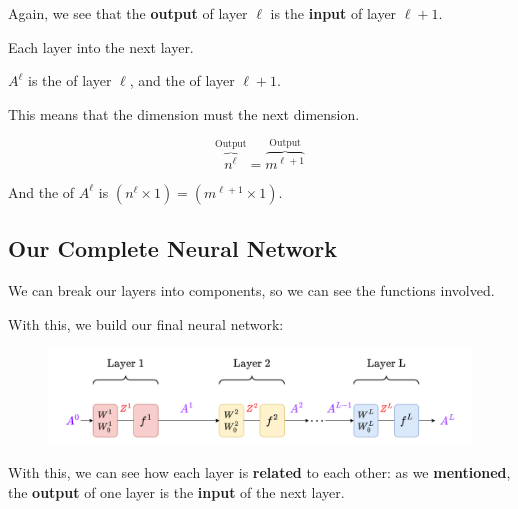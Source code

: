         Again, we see that the \textbf{output} of layer $\ell$ is the \textbf{input} of layer $\ell+1$.\\
        
        \begin{concept}
            Each layer  into the next layer.
            
            $A^\ell$ is the  of layer $\ell$, and the  of layer $\ell+1$.
            
            This means that the  dimension must  the next  dimension.
            
            \begin{equation*}
                \overbrace{
                    n^\ell
                }^{\text{Output}}
                =
                \overbrace{
                    m^{\ell+1}
                }^{\text{Output}}
            \end{equation*}
            
            And the  of $A^\ell$ is $(n^\ell \times 1) = (m^{\ell+1} \times 1)$.
        \end{concept}
        
    \subsection{Our Complete Neural Network}
    
        We can break our layers into components, so we can see the functions involved. 
        
        With this, we build our final neural network:
        
        \begin{figure}[H]
            \centering
            \includegraphics[width=140mm,scale=0.4]{images/nn_images/final_neural_network.png}
        \end{figure}
        
        With this, we can see how each layer is \textbf{related} to each other: as we \textbf{mentioned}, the \textbf{output} of one layer is the \textbf{input} of the next layer.
        
